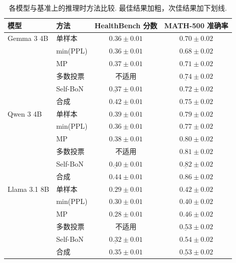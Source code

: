 \begin{longtable}{llcc}
\caption{各模型与基准上的推理时方法比较. 最佳结果加粗，次佳结果加下划线.}\label{cat-tab:results-inf}\\

        \toprule
        模型 & 方法 & HealthBench 分数 & MATH-500 准确率 \\
        \midrule
        Gemma 3 4B 
        & 单样本 & $0.36 \pm 0.01$ & $0.70 \pm 0.02$ \\
        & min(PPL) & $0.36 \pm 0.01$ & $0.68 \pm 0.02$ \\
        & MP & $0.37 \pm 0.01$ & $0.71 \pm 0.02$ \\
        & 多数投票 & 不适用 & $\underline{0.74} \pm 0.02$ \\
        & Self-BoN & $\underline{0.37} \pm 0.01$ & ${0.72} \pm 0.02$ \\
        & 合成 & $\mathbf{0.42} \pm 0.01$ & $\mathbf{0.75} \pm 0.02$ \\
        \midrule
        Qwen 3 4B 
        & 单样本 & $0.39 \pm 0.01$ & $0.79 \pm 0.02$ \\
        & min(PPL) & $0.36 \pm 0.01$ & $0.77 \pm 0.02$ \\
        & MP & $0.38 \pm 0.01$ & $0.80 \pm 0.02$ \\
        & 多数投票 & 不适用 & $0.81 \pm 0.02$ \\
        & Self-BoN & $\underline{0.40} \pm 0.01$ & $\underline{0.82} \pm 0.02$ \\
        & 合成 & $\mathbf{0.44} \pm 0.01$ & $\mathbf{0.86} \pm 0.02$ \\
        \midrule
        Llama 3.1 8B
        & 单样本 & $0.29 \pm 0.01$ & $0.42 \pm 0.02$ \\
        & min(PPL) & $0.30 \pm 0.01$ & $0.40 \pm 0.02$ \\
        & MP & $0.28 \pm 0.01$ & $0.46 \pm 0.02$ \\
        & 多数投票 & 不适用 & $\underline{0.53} \pm 0.02$ \\
        & Self-BoN & $\underline{0.32} \pm 0.01$ & $\mathbf{0.54} \pm 0.02$ \\
        & 合成 & $\mathbf{0.35} \pm 0.01$ & $\underline{0.53} \pm 0.02$ \\
        \bottomrule
    
\end{longtable}
